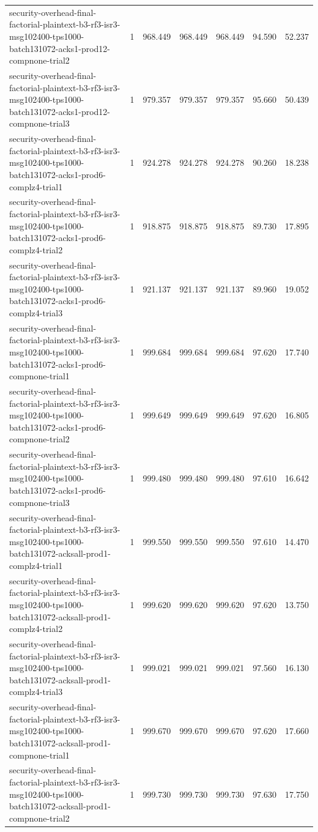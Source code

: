 \begin{tabular}{lrrrrrr}
security-overhead-final-factorial-plaintext-b3-rf3-isr3-msg102400-tps1000-batch131072-acks1-prod12-compnone-trial2 & 1 & 968.449 & 968.449 & 968.449 & 94.590 & 52.237 \\
security-overhead-final-factorial-plaintext-b3-rf3-isr3-msg102400-tps1000-batch131072-acks1-prod12-compnone-trial3 & 1 & 979.357 & 979.357 & 979.357 & 95.660 & 50.439 \\
security-overhead-final-factorial-plaintext-b3-rf3-isr3-msg102400-tps1000-batch131072-acks1-prod6-complz4-trial1 & 1 & 924.278 & 924.278 & 924.278 & 90.260 & 18.238 \\
security-overhead-final-factorial-plaintext-b3-rf3-isr3-msg102400-tps1000-batch131072-acks1-prod6-complz4-trial2 & 1 & 918.875 & 918.875 & 918.875 & 89.730 & 17.895 \\
security-overhead-final-factorial-plaintext-b3-rf3-isr3-msg102400-tps1000-batch131072-acks1-prod6-complz4-trial3 & 1 & 921.137 & 921.137 & 921.137 & 89.960 & 19.052 \\
security-overhead-final-factorial-plaintext-b3-rf3-isr3-msg102400-tps1000-batch131072-acks1-prod6-compnone-trial1 & 1 & 999.684 & 999.684 & 999.684 & 97.620 & 17.740 \\
security-overhead-final-factorial-plaintext-b3-rf3-isr3-msg102400-tps1000-batch131072-acks1-prod6-compnone-trial2 & 1 & 999.649 & 999.649 & 999.649 & 97.620 & 16.805 \\
security-overhead-final-factorial-plaintext-b3-rf3-isr3-msg102400-tps1000-batch131072-acks1-prod6-compnone-trial3 & 1 & 999.480 & 999.480 & 999.480 & 97.610 & 16.642 \\
security-overhead-final-factorial-plaintext-b3-rf3-isr3-msg102400-tps1000-batch131072-acksall-prod1-complz4-trial1 & 1 & 999.550 & 999.550 & 999.550 & 97.610 & 14.470 \\
security-overhead-final-factorial-plaintext-b3-rf3-isr3-msg102400-tps1000-batch131072-acksall-prod1-complz4-trial2 & 1 & 999.620 & 999.620 & 999.620 & 97.620 & 13.750 \\
security-overhead-final-factorial-plaintext-b3-rf3-isr3-msg102400-tps1000-batch131072-acksall-prod1-complz4-trial3 & 1 & 999.021 & 999.021 & 999.021 & 97.560 & 16.130 \\
security-overhead-final-factorial-plaintext-b3-rf3-isr3-msg102400-tps1000-batch131072-acksall-prod1-compnone-trial1 & 1 & 999.670 & 999.670 & 999.670 & 97.620 & 17.660 \\
security-overhead-final-factorial-plaintext-b3-rf3-isr3-msg102400-tps1000-batch131072-acksall-prod1-compnone-trial2 & 1 & 999.730 & 999.730 & 999.730 & 97.630 & 17.750 \\

\end{tabular}
